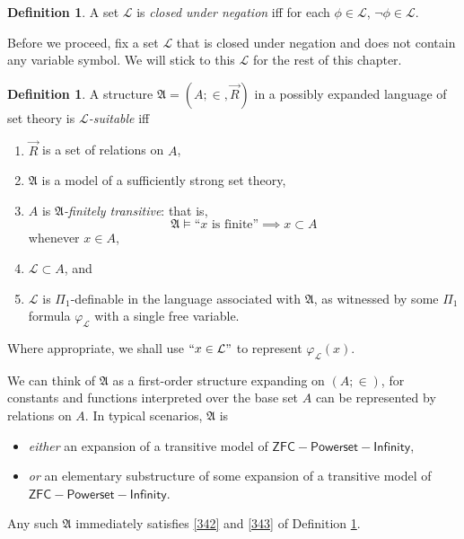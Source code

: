 \documentclass[12pt, twoside]{memoir}
\numberwithin{equation}{section}
\theoremstyle{definition}
\newtheorem{defi}[thm]{Definition}
\theoremstyle{remark}
\theoremstyle{definition}
\theoremstyle{definition}
\theoremstyle{definition}
\theoremstyle{remark}
\begin{document}
\begin{defi}
A set $\mathcal{L}$ is \emph{closed under negation} iff for each $\phi \in \mathcal{L}$, $\neg \phi \in \mathcal{L}$.
\end{defi}

Before we proceed, fix a set $\mathcal{L}$ that is closed under negation and does not contain any variable symbol. We will stick to this $\mathcal{L}$ for the rest of this chapter.

\begin{defi}\label{lsuitable}
A structure $\mathfrak{A} = (A; \in, \Vec{R})$ in a possibly expanded language of set theory is $\mathcal{L}$\emph{-suitable} iff
\begin{enumerate}[label=(\alph*)]
    \item $\Vec{R}$ is a set of relations on $A$,
    \item\label{342} $\mathfrak{A}$ is a model of a sufficiently strong set theory,
    \item\label{343} $A$ is $\mathfrak{A}$\emph{-finitely transitive}: that is, 
    \begin{equation*}
        \mathfrak{A} \models \text{``} x \text{ is finite''} \implies x \subset A 
    \end{equation*}
    whenever $x \in A$, 
    \item $\mathcal{L} \subset A$, and
    \item\label{def210e} $\mathcal{L}$ is $\Pi_1$-definable in the language associated with $\mathfrak{A}$, as witnessed by some $\Pi_1$ formula $\varphi_{\mathcal{L}}$ with a single free variable.
\end{enumerate}
Where appropriate, we shall use $``x \in \mathcal{L}"$ to represent $\varphi_{\mathcal{L}}(x)$.
\end{defi}

We can think of $\mathfrak{A}$ as a first-order structure expanding on $(A; \in)$, for constants and functions interpreted over the base set $A$ can be represented by relations on $A$. In typical scenarios, $\mathfrak{A}$ is
\begin{itemize}
    \item \emph{either} an expansion of a transitive model of $\mathsf{ZFC - Powerset - Infinity}$,
    \item \emph{or} an elementary substructure of some expansion of a transitive model of \\ $\mathsf{ZFC - Powerset - Infinity}$.
\end{itemize} 
Any such $\mathfrak{A}$ immediately satisfies \ref{342} and \ref{343} of Definition \ref{lsuitable}. 
\end{document}
